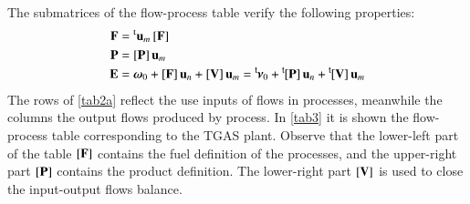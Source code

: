 \documentclass{ecos}
\begin{document}
The submatrices of the flow-process table verify the following properties:
\begin{align}
\mathbf{F}&=\prescript{\smash{\mathrm{t}}}{}{\mathbf{u}}_m\,[\mathbf{F}] \\
\mathbf{P}&=[\mathbf{P}]\,\mathbf{u}_m \\
\mathbf{E}&=\bm{\omega}_0 + [\mathbf{F}]\,\mathbf{u}_n + [\mathbf{V}]\,\mathbf{u}_m = \prescript{\smash{\mathsf{t}}}{}{\mskip-1mu}\bm{\nu}_0 + \prescript{\smash{\mathsf{t}}}{}{\mskip-1mu}[\mathbf{P}]\,\mathbf{u}_n + \prescript{\smash{\mathsf{t}}}{}{\mskip-1mu}[\mathbf{V}]\,\mathbf{u}_m
\end{align}
The rows of \cref{tab2a} reflect the use inputs of flows in processes, meanwhile the columns the output flows produced by process. In \cref{tab3} it is shown the flow-process table corresponding to the TGAS plant. Observe that the lower-left part of the table $\left[ \textbf{F} \right]$ contains the fuel definition of the processes, and the upper-right part $\left[ \textbf{P} \right]$ contains the product definition. The lower-right part $\left[ \textbf{V} \right]$ is used to close the input-output flows balance.
\end{document}
